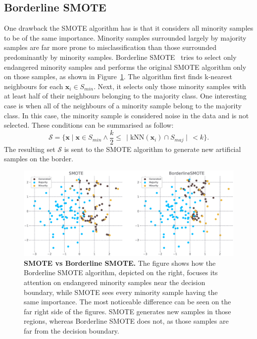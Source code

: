 \subsection{Borderline SMOTE}
\label{subsection:bordeline-smote}

One drawback the SMOTE algorithm has is that it considers all minority samples to be of the same
importance. Minority samples surrounded largely by majority samples are far more prone to
misclassification than those surrounded predominantly by minority samples. Borderline
SMOTE~\cite{borderline-smote} tries to select only endangered minority samples and performs the
original SMOTE algorithm only on those samples, as shown in
Figure~\ref{figure:smote-vs-borderline}. The algorithm first finds k-nearest neighbours for each
$\mathbf{x}_i \in S_{min}$. Next, it selects only those minority samples with at least half of
their neighbours belonging to the majority class. One interesting case is when all of the
neighbours of a minority sample belong to the majority class. In this case, the minority sample is
considered noise in the data and is not selected. These conditions can be summarised as follow:
\begin{equation}
    \mathcal{S} = \{\mathbf{x} \mid \mathbf{x} \in S_{min} \land \frac{k}{2} \leq \, \mid
        \mathrm{kNN}(\mathbf{x}_i) \cap S_{maj} \mid \, < k\}.
\end{equation}
The resulting set $\mathcal{S}$ is sent to the SMOTE algorithm to generate new artificial samples
on the border.

\begin{figure}
    \centering
    \includegraphics[width=\linewidth]{figures/smote_vs_borderlinesmote.eps}
    \caption{
        \textbf{SMOTE vs Borderline SMOTE.} The figure shows how the Borderline SMOTE algorithm,
        depicted on the right, focuses its attention on endangered minority samples near the
        decision boundary, while SMOTE sees every minority sample having the same importance. The
        most noticeable difference can be seen on the far right side of the figures. SMOTE
        generates new samples in those regions, whereas Borderline SMOTE does not, as those samples
        are far from the decision boundary.
    }
    \label{figure:smote-vs-borderline}
\end{figure}
